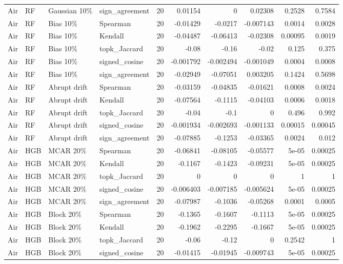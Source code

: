 \begin{tabular}{llllrrrrrr}
Air & RF & Gaussian 10\% & sign\_agreement & 20 & 0.01154 & 0 & 0.02308 & 0.2528 & 0.7584 \\
Air & RF & Bias 10\% & Spearman & 20 & -0.01429 & -0.0217 & -0.007143 & 0.0014 & 0.0028 \\
Air & RF & Bias 10\% & Kendall & 20 & -0.04487 & -0.06413 & -0.02308 & 0.00095 & 0.0019 \\
Air & RF & Bias 10\% & topk\_Jaccard & 20 & -0.08 & -0.16 & -0.02 & 0.125 & 0.375 \\
Air & RF & Bias 10\% & signed\_cosine & 20 & -0.001792 & -0.002494 & -0.001049 & 0.0004 & 0.0008 \\
Air & RF & Bias 10\% & sign\_agreement & 20 & -0.02949 & -0.07051 & 0.003205 & 0.1424 & 0.5698 \\
Air & RF & Abrupt drift & Spearman & 20 & -0.03159 & -0.04835 & -0.01621 & 0.0008 & 0.0024 \\
Air & RF & Abrupt drift & Kendall & 20 & -0.07564 & -0.1115 & -0.04103 & 0.0006 & 0.0018 \\
Air & RF & Abrupt drift & topk\_Jaccard & 20 & -0.04 & -0.1 & 0 & 0.496 & 0.992 \\
Air & RF & Abrupt drift & signed\_cosine & 20 & -0.001934 & -0.002693 & -0.001133 & 0.00015 & 0.00045 \\
Air & RF & Abrupt drift & sign\_agreement & 20 & -0.07885 & -0.1253 & -0.03365 & 0.0024 & 0.012 \\
Air & HGB & MCAR 20\% & Spearman & 20 & -0.06841 & -0.08105 & -0.05577 & 5e-05 & 0.00025 \\
Air & HGB & MCAR 20\% & Kendall & 20 & -0.1167 & -0.1423 & -0.09231 & 5e-05 & 0.00025 \\
Air & HGB & MCAR 20\% & topk\_Jaccard & 20 & 0 & 0 & 0 & 1 & 1 \\
Air & HGB & MCAR 20\% & signed\_cosine & 20 & -0.006403 & -0.007185 & -0.005624 & 5e-05 & 0.00025 \\
Air & HGB & MCAR 20\% & sign\_agreement & 20 & -0.07987 & -0.1036 & -0.05268 & 0.0001 & 0.0005 \\
Air & HGB & Block 20\% & Spearman & 20 & -0.1365 & -0.1607 & -0.1113 & 5e-05 & 0.00025 \\
Air & HGB & Block 20\% & Kendall & 20 & -0.1962 & -0.2295 & -0.1667 & 5e-05 & 0.00025 \\
Air & HGB & Block 20\% & topk\_Jaccard & 20 & -0.06 & -0.12 & 0 & 0.2542 & 1 \\
Air & HGB & Block 20\% & signed\_cosine & 20 & -0.01415 & -0.01945 & -0.009743 & 5e-05 & 0.00025 \\

\end{tabular}
